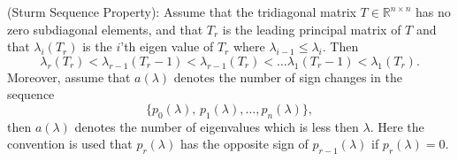 %
\begin{theorem}
(Sturm Sequence Property):
Assume that the tridiagonal matrix $T\in\mathbb R^{n\times n}$ has no zero subdiagonal elements, 
and that $T_r$ is the leading principal matrix of $T$ and that 
$\lambda_i(T_r)$ is the $i$'th eigen value of $T_r$ where $\lambda_{i-1}\le\lambda_{i}$. Then
\begin{equation*}
	\lambda_{r}(T_{r}) <
	\lambda_{r-1}(T_r-1) <
	\lambda_{r-1}(T_r) <
	\dots
	\lambda_{1}(T_r-1) <
	\lambda_{1}(T_{r}) .
\end{equation*} 
Moreover, assume that $a(\lambda)$ denotes the number of sign changes in the sequence
\begin{equation*}
	\{p_0(\lambda),\, p_1(\lambda),\dots,p_n(\lambda)\},
\end{equation*}
then $a(\lambda)$ denotes the number of eigenvalues which is less then $\lambda$. Here the convention is used that $p_r(\lambda)$ has the opposite sign of
$p_{r-1}(\lambda)$ if $p_r(\lambda)=0$.  
\end{theorem}
%
%

